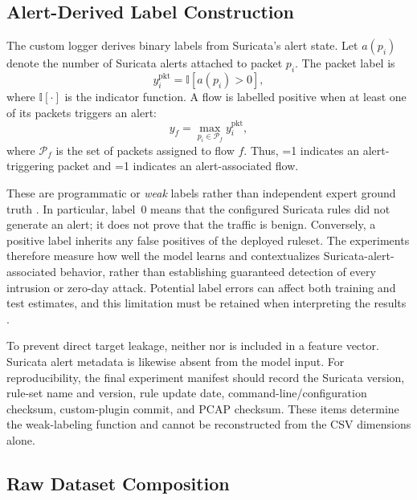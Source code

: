 \subsection{Alert-Derived Label Construction}
\label{subsec:label_construction}

The custom logger derives binary labels from Suricata's alert state. Let
$a(p_i)$ denote the number of Suricata alerts attached to packet $p_i$. The
packet label is
\begin{equation}
    y_i^{\mathrm{pkt}}
    = \mathbb{I}\!\left[a(p_i)>0\right],
    \label{eq:packet_alert_label}
\end{equation}
where $\mathbb{I}[\cdot]$ is the indicator function. A flow is labelled
positive when at least one of its packets triggers an alert:
\begin{equation}
    y_f
    = \max_{p_i\in\mathcal{P}_f} y_i^{\mathrm{pkt}},
    \label{eq:flow_alert_label}
\end{equation}
where $\mathcal{P}_f$ is the set of packets assigned to flow $f$. Thus,
=1 indicates an alert-triggering packet and
=1 indicates an alert-associated flow.

These are programmatic or \emph{weak} labels rather than independent expert
ground truth \cite{Ratner2017Snorkel}. In particular, label~0 means that the
configured Suricata rules did not generate an alert; it does not prove that the
traffic is benign. Conversely, a positive label inherits any false positives
of the deployed ruleset. The experiments therefore measure how well the model
learns and contextualizes Suricata-alert-associated behavior, rather than
establishing guaranteed detection of every intrusion or zero-day attack.
Potential label errors can affect both training and test estimates, and this
limitation must be retained when interpreting the results
\cite{Northcutt2021ConfidentLearning}.

To prevent direct target leakage, neither  nor
 is included in a feature vector. Suricata alert metadata
is likewise absent from the model input. For reproducibility, the final
experiment manifest should record the Suricata version, rule-set name and
version, rule update date, command-line/configuration checksum, custom-plugin
commit, and PCAP checksum. These items determine the weak-labeling function and
cannot be reconstructed from the CSV dimensions alone.

\subsection{Raw Dataset Composition}
\label{subsec:raw_composition}


